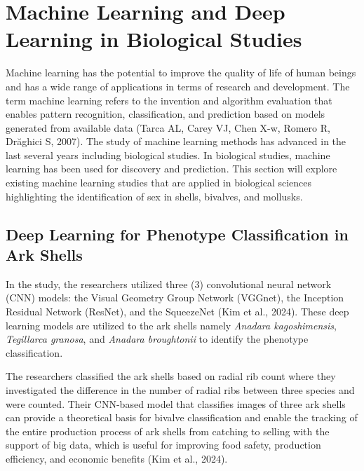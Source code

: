 \section{Machine Learning and Deep Learning in Biological Studies}
Machine learning has the potential to improve the quality of life of human beings and has a wide range of applications in terms of research and development. The term machine learning refers to the invention and algorithm evaluation that enables pattern recognition, classification, and prediction based on models generated from available data (Tarca AL, Carey VJ, Chen X-w, Romero R, Drăghici S, 2007). The study of machine learning methods has advanced in the last several years including biological studies. In biological studies, machine learning has been used for discovery and prediction. This section will explore existing machine learning studies that are applied in biological sciences highlighting the identification of sex in shells, bivalves, and mollusks.

\subsection{Deep Learning for Phenotype Classification in Ark Shells}
In the study, the researchers utilized three (3) convolutional neural network (CNN) models: the Visual Geometry Group Network (VGGnet), the Inception Residual Network (ResNet), and the SqueezeNet (Kim et al., 2024). These deep learning models are utilized to the ark shells namely \textit{Anadara kagoshimensis}, \textit{Tegillarca granosa}, and \textit{Anadara broughtonii} to identify the phenotype classification. 

The researchers classified the ark shells based on radial rib count where they investigated the difference in the number of radial ribs between three species and were counted. Their CNN-based model that classifies images of three ark shells can provide a theoretical basis for bivalve classification and enable the tracking of the entire production process of ark shells from catching to selling with the support of big data, which is useful for improving food safety, production efficiency, and economic benefits (Kim et al., 2024).

